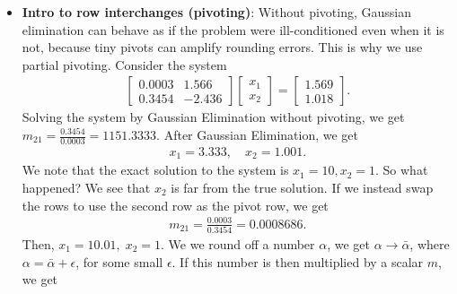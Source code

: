 \documentclass{report}
\begin{document}
\begin{itemize}
        \item \textbf{Intro to row interchanges (pivoting)}: Without pivoting, Gaussian elimination can behave as if the problem were ill-conditioned even when it is not, because tiny pivots can amplify rounding errors. This is why we use partial pivoting.
            \bigbreak \noindent 
            Consider the system
            \begin{align*}
                \begin{bmatrix}
                    0.0003 & 1.566 \\
                    0.3454 & -2.436
                \end{bmatrix}
                \begin{bmatrix}
                    x_{1} \\ x_{2}
                \end{bmatrix}
                =
                \begin{bmatrix}
                    1.569 \\ 1.018
                \end{bmatrix}
            .\end{align*}
            Solving the system by Gaussian Elimination without pivoting, we get $m_{21} = \frac{0.3454}{0.0003} = 1151.3333$. After Gaussian Elimination, we get
            \begin{align*}
                x_{1} = 3.333, \quad x_{2} = 1.001
            .\end{align*}
            We note that the exact solution to the system is $x_{1} = 10, x_{2} = 1$. So what happened? We see that $x_{2}$ is far from the true solution.
            \bigbreak \noindent 
            If we instead swap the rows to use the second row as the pivot row, we get
            \begin{align*}
                m_{21} = \frac{0.0003}{0.3454} = 0.0008686
            .\end{align*}
            Then, $x_{1} = 10.01,\; x_{2} = 1$.
            \bigbreak \noindent 
            We we round off a number $\alpha$, we get $\alpha \to \bar{\alpha}$, where $\alpha = \bar{\alpha} + \epsilon $, for some small $\epsilon$. If this number is then multiplied by a scalar $m$, we get

\end{itemize}
\end{document}
